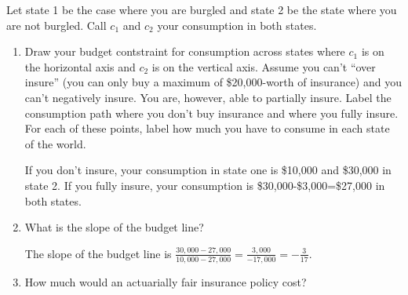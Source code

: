 \documentclass[12pt]{article}
\newcounter{question}[section]
\newenvironment{subquestions}{
  \begin{enumerate}[label=(\roman*)]}{\end{enumerate}}
\begin{document}
Let state 1 be the case where you are burgled and state 2 be the state where
you are not burgled. Call $c_1$ and $c_2$ your consumption in both states.
\begin{subquestions}
  \item Draw your budget contstraint for consumption across states where $c_1$
    is on the horizontal axis and $c_2$ is on the vertical axis. Assume you
    can't ``over insure'' (you can only buy a maximum of \$20,000-worth of
    insurance) and you can't negatively insure. You are, however, able to
    partially insure. Label the consumption path where you don't buy insurance
    and where you fully insure.  For each of these points, label how much you
    have to consume in each state of the world.

    \textcolor{solution-color}{
      If you don't insure, your consumption in state one is \$10,000 and
      \$30,000 in state 2. If you fully insure, your consumption is
      \$30,000-\$3,000=\$27,000 in both states.
      \begin{center}
      \end{center}
    }
  \item What is the slope of the budget line?

    \textcolor{solution-color}{
      The slope of the budget line is
      $\frac{30,000-27,000}{10,000-27,000}=\frac{3,000}{-17,000}=-\frac{3}{17}$.
    }
  \item How much would an actuarially fair insurance policy cost?


\end{subquestions}
\end{document}
